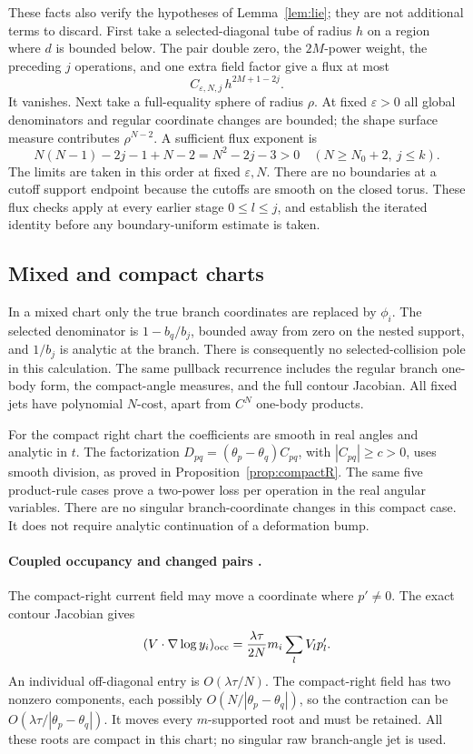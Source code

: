 \documentclass[11pt]{article}
\numberwithin{equation}{section}
\theoremstyle{definition}
\newcommand{\eps}{\varepsilon}
\begin{document}
These facts also verify the hypotheses of Lemma~\ref{lem:lie};
they are not additional terms to discard.
First take a selected-diagonal tube of radius \(h\) on a region
where \(d\) is bounded below. The pair double zero, the
\(2M\)-power weight, the preceding \(j\) operations, and one
extra field factor give a flux at most
\[
 C_{\eps,N,j}\,h^{2M+1-2j}.
\]
It vanishes. Next take a full-equality sphere of radius \(\rho\).
At fixed \(\eps>0\) all global denominators and regular coordinate
changes are bounded; the shape surface measure contributes
\(\rho^{N-2}\). A sufficient flux exponent is
\[
 N(N-1)-2j-1+N-2=N^2-2j-3>0
 \quad(N\ge N_0+2,\ j\le k).
\]
The limits are taken in this order at fixed \(\eps,N\).
There are no boundaries at a cutoff support endpoint because
the cutoffs are smooth on the closed torus. These flux checks
apply at every earlier stage \(0\le l\le j\), and establish the
iterated identity before any boundary-uniform estimate is taken.

\subsection{Mixed and compact charts}
In a mixed chart only the true branch coordinates are replaced
by \(\phi_i\). The selected denominator is \(1-b_q/b_j\), bounded
away from zero on the nested support, and \(1/b_j\) is analytic
at the branch. There is consequently no selected-collision pole
in this calculation. The same pullback recurrence includes the
regular branch one-body form, the compact-angle measures, and
the full contour Jacobian. All fixed jets have polynomial
\(N\)-cost, apart from \(C^N\) one-body products.

For the compact right chart the coefficients are smooth in real
angles and analytic in \(t\). The factorization
\(D_{pq}=(\theta_p-\theta_q)C_{pq}\), with \(|C_{pq}|\ge c>0\),
uses smooth division, as proved in Proposition~\ref{prop:compactR}.
The same five product-rule cases prove a two-power loss per
operation in the real angular variables. There are no singular
branch-coordinate changes in this compact case. It does not
require analytic continuation of a deformation bump.

\paragraph{Coupled occupancy and changed pairs .}
The compact-right current field may move a coordinate where
\(p'\ne0\). The exact contour Jacobian gives
\[
 (V\cdot\nabla\log y_i)_{\rm occ}
   =\frac{\lambda\tau}{2N}m_i\sum_l V_l p'_l.
\]
An individual off-diagonal entry is \(O(\lambda\tau/N)\).
The compact-right field has two nonzero components, each possibly
\(O(N/|\theta_p-\theta_q|)\), so the contraction can be
\(O(\lambda\tau/|\theta_p-\theta_q|)\). It moves every
\(m\)-supported root and must be retained. All these roots are
compact in this chart; no singular raw branch-angle jet is used.
\end{document}
